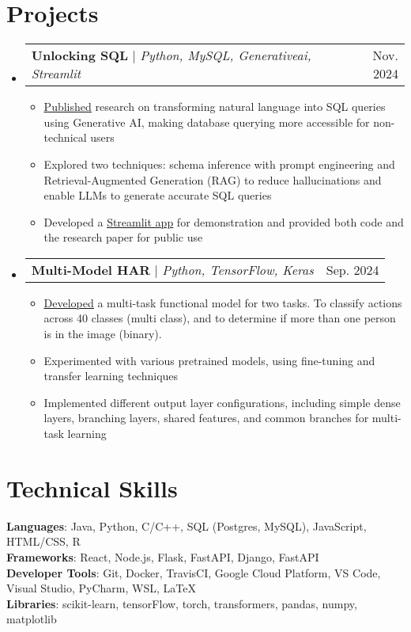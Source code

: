 \documentclass[letterpaper,11pt]{article}
\makeatletter
\newcommand{\resumeItem}[1]{
  \item\small{
    {#1 \vspace{-2pt}}
  }
}
\newcommand{\resumeProjectHeading}[2]{
    \item
    \begin{tabular*}{0.97\textwidth}{l@{\extracolsep{\fill}}r}
      \small#1 & #2 \\
    \end{tabular*}\vspace{-7pt}
}
\newcommand{\resumeSubHeadingListStart}{\begin{itemize}[leftmargin=0.15in, label={}]}
\newcommand{\resumeSubHeadingListEnd}{\end{itemize}}
\newcommand{\resumeItemListStart}{\begin{itemize}}
\newcommand{\resumeItemListEnd}{\end{itemize}\vspace{-5pt}}
\makeatother
\begin{document}
\section{Projects}
    \resumeSubHeadingListStart
      \resumeProjectHeading
          {\textbf{Unlocking SQL} $|$ \emph{Python, MySQL, Generativeai, Streamlit}}{Nov. 2024}
          \resumeItemListStart
            \resumeItem{\href{https://app.readytensor.ai/publications/unlocking_sql_converting_natural_language_into_query_results_with_generative_ai_hrWFsOxy9Yfy}{\underline{Published}} research on transforming natural language into SQL queries using Generative AI, making database querying more accessible for non-technical users}
            \resumeItem{Explored two techniques: schema inference with prompt engineering and Retrieval-Augmented Generation (RAG) to reduce hallucinations and enable LLMs to generate accurate SQL queries}
            \resumeItem{Developed a \href{https://sql-unlocked.streamlit.app/}{\underline{Streamlit app}} for demonstration and provided both code and the research paper for public use}
          \resumeItemListEnd
      \resumeProjectHeading
          {\textbf{Multi-Model HAR} $|$ \emph{Python, TensorFlow, Keras}}{Sep. 2024}
          \resumeItemListStart
            \resumeItem{\href{https://github.com/ahmedsalim3/MultiModel-HAR/blob/main/notebooks/notebook.ipynb}{\underline{Developed}} a multi-task functional model for two tasks. To classify actions across 40 classes (multi class), and to determine if more than one person is in the image (binary).}
            \resumeItem{Experimented with various pretrained models, using fine-tuning and transfer learning techniques}
            \resumeItem{ Implemented different output layer configurations, including simple dense layers, branching layers, shared features, and common branches for multi-task learning}
          \resumeItemListEnd
    \resumeSubHeadingListEnd

\section{Technical Skills}
 \begin{itemize}[leftmargin=0.15in, label={}]
    \small{\item{
     \textbf{Languages}{: Java, Python, C/C++, SQL (Postgres, MySQL), JavaScript, HTML/CSS, R} \\
     \textbf{Frameworks}{: React, Node.js, Flask, FastAPI, Django, FastAPI} \\
     \textbf{Developer Tools}{: Git, Docker, TravisCI, Google Cloud Platform, VS Code, Visual Studio, PyCharm, WSL, LaTeX} \\
     \textbf{Libraries}{: scikit-learn, tensorFlow, torch, transformers, pandas, numpy, matplotlib}
    }}
 \end{itemize}
\end{document}
